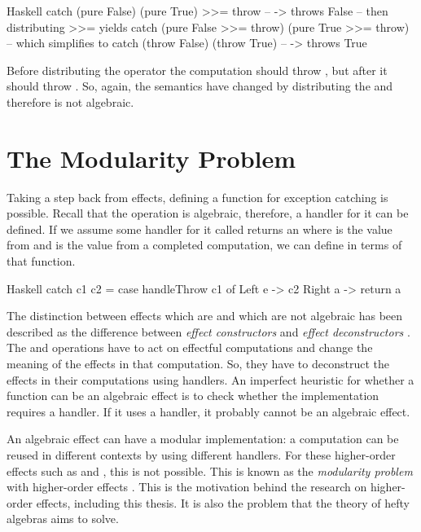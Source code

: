 \begin{lst}{Haskell}
catch (pure False)  (pure True) >>= throw -- -> throws False
-- then distributing >>= yields
catch
  (pure False >>= throw)
  (pure True >>= throw)
-- which simplifies to
catch (throw False) (throw True)          -- -> throws True
\end{lst}
%
Before distributing the \hs{>>=} operator the computation should throw , but after it should throw . So, again, the semantics have changed by distributing the \hs{>>=} and therefore  is not algebraic.

\section{The Modularity Problem}

Taking a step back from effects, defining a function for exception catching is possible. Recall that the  operation is algebraic, therefore, a handler for it can be defined. If we assume some handler for it called  returns an  where  is the value from  and  is the value from a completed computation, we can define  in terms of that function.

\begin{lst}{Haskell}
catch c1 c2 =
  case handleThrow c1 of
    Left e -> c2
    Right a -> return a
\end{lst}
%
The distinction between effects which are and which are not algebraic has been described as the difference between \emph{effect constructors} and \emph{effect deconstructors} \autocite{plotkin_algebraic_2003}. The  and  operations have to act on effectful computations and change the meaning of the effects in that computation. So, they have to deconstruct the effects in their computations using handlers. An imperfect heuristic for whether a function can be an algebraic effect is to check whether the implementation requires a handler. If it uses a handler, it probably cannot be an algebraic effect.

An algebraic effect can have a modular implementation: a computation can be reused in different contexts by using different handlers. For these higher-order effects such as  and , this is not possible. This is known as the \emph{modularity problem} with higher-order effects \autocite{wu_effect_2014}. This is the motivation behind the research on higher-order effects, including this thesis. It is also the problem that the theory of hefty algebras aims to solve.


